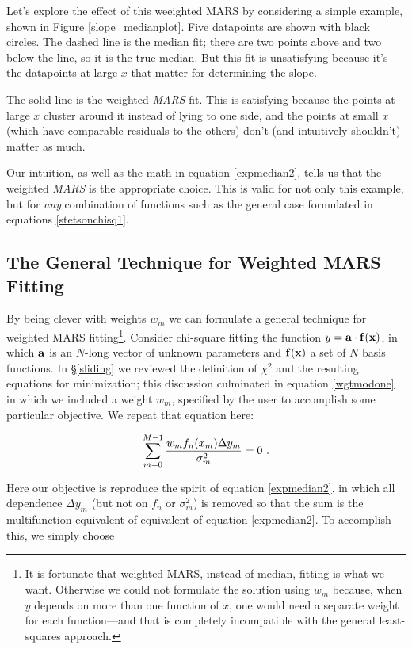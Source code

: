 \documentclass[psfig,preprint]{aastex}
\begin{document}
	Let's explore the effect of this weeighted MARS by considering a simple
example, shown in Figure \ref{slope_medianplot}. Five datapoints are
shown with black circles. The dashed line is the median fit; there are
two points above and two below the line, so it is the true median. But
this fit is unsatisfying because it's the datapoints at large $x$ that
matter for determining the slope. 

	The solid line is the weighted {\it MARS} fit. This is
satisfying because the points at large $x$ cluster around it instead of
lying to one side, and the points at small $x$ (which have comparable
residuals to the others) don't (and intuitively shouldn't) matter as much. 

	Our intuition, as well as the math in equation \ref{expmedian2},
tells us that the weighted {\it MARS} is the appropriate choice. This
is valid for not only this example, but for {\it any} combination of
functions such as the general case formulated in equations
\ref{stetsonchisq1}. 

\subsection{ The General Technique for Weighted MARS Fitting}

	By being clever with weights $w_m$ we can formulate a general
technique for weighted MARS fitting\footnote{It is fortunate that
weighted MARS, instead of median, fitting is what we want. Otherwise
we could not formulate the solution using $w_m$ because, when $y$
depends on more than one function of $x$, one would need a separate
weight for each function---and that is completely incompatible with the
general least-squares approach.}. Consider chi-square fitting the
function $y = {\bf a \cdot f(x)}$, in which ${\bf a}$ is an $N$-long
vector of unknown parameters and ${\bf f(x)}$ a set of $N$ basis
functions. In \S \ref{sliding} we reviewed the definition of $\chi^2$
and the resulting equations for minimization; this discussion culminated
in equation \ref{wgtmodone} in which we included a weight $w_m$,
specified by the user to accomplish some particular objective. We repeat
that equation here:

\begin{equation} \label{wgtmodone2}
\sum_{m=0}^{M-1} { w_m f_n(x_m) \Delta y_m
\over \sigma_m^2} = 0 \ .
\end{equation}

	Here our objective is reproduce the spirit of equation
\ref{expmedian2}, in which all dependence $\Delta y_m$ (but not on $f_n$
or $\sigma_m^2$) is removed so that the sum is the multifunction
equivalent of equivalent of equation \ref{expmedian2}.  To accomplish
this, we simply choose
\end{document}
